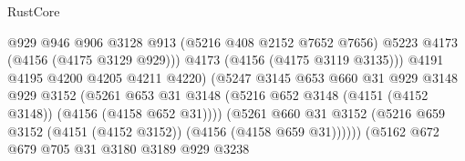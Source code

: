 \begin{lexlean}{RustCore}
\begin{coremodule}
                                            @929
                                            @946
                                            @906
                                            @3128
                                            @913
                                            (@5216 @408 @2152 @7652 @7656)
                                            @5223
                                            @4173
                                            (@4156 (@4175 @3129 @929)))
                                          @4173
                                          (@4156 (@4175 @3119 @3135)))
                                        @4191
                                        @4195
                                        @4200
                                        @4205
                                        @4211
                                        @4220)
                                      (@5247
                                        @3145
                                        @653
                                        @660
                                        @31
                                        @929
                                        @3148
                                        @929
                                        @3152
                                        (@5261
                                          @653
                                          @31
                                          @3148
                                          (@5216
                                            @652
                                            @3148
                                            (@4151 (@4152 @3148))
                                            (@4156 (@4158 @652 @31))))
                                        (@5261
                                          @660
                                          @31
                                          @3152
                                          (@5216
                                            @659
                                            @3152
                                            (@4151 (@4152 @3152))
                                            (@4156 (@4158 @659 @31))))))
                                    (@5162
                                      @672
                                      @679
                                      @705
                                      @31
                                      @3180
                                      @3189
                                      @929
                                      @3238

\end{coremodule}
\end{lexlean}

